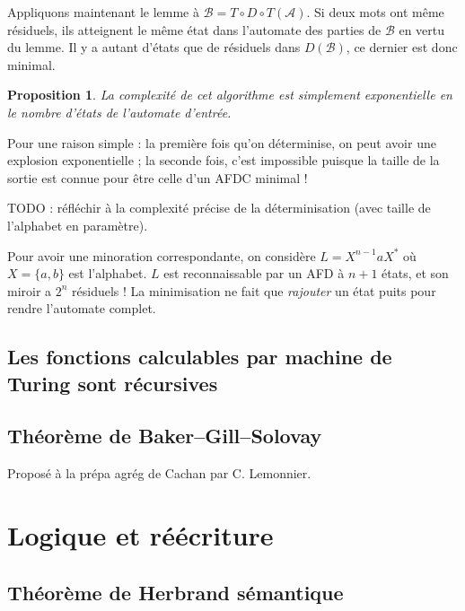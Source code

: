 \documentclass[a4paper, 11pt]{article}
\newtheorem*{proposition}{Proposition}
\begin{document}
Appliquons maintenant le lemme à $\mathcal{B} = T \circ D \circ T(\mathcal{A})$.
Si deux mots ont même résiduels, ils atteignent le même état dans l'automate des
parties de $\mathcal{B}$ en vertu du lemme. Il y a autant d'états que de
résiduels dans $D(\mathcal{B})$, ce dernier est donc minimal.

\begin{proposition}
  La complexité de cet algorithme est simplement exponentielle en le nombre
  d'états de l'automate d'entrée.
\end{proposition}

Pour une raison simple : la première fois qu'on déterminise, on peut avoir une
explosion exponentielle ; la seconde fois, c'est impossible puisque la taille de
la sortie est connue pour être celle d'un AFDC minimal !

TODO : réfléchir à la complexité précise de la déterminisation (avec taille de
l'alphabet en paramètre).

Pour avoir une minoration correspondante, on considère $L = X^{n-1}aX^*$ où $X =
\{a,b\}$ est l'alphabet. $L$ est reconnaissable par un AFD à $n+1$ états, et son
miroir a $2^n$ résiduels ! La minimisation ne fait que \emph{rajouter} un état
puits pour rendre l'automate complet.

\newpage

\subsection{Les fonctions calculables par machine de Turing sont récursives}



\newpage

\subsection{Théorème de Baker--Gill--Solovay}

Proposé à la prépa agrég de Cachan par C. Lemonnier.

\newpage

\section{Logique et réécriture}

\subsection{Théorème de Herbrand sémantique}
\end{document}
